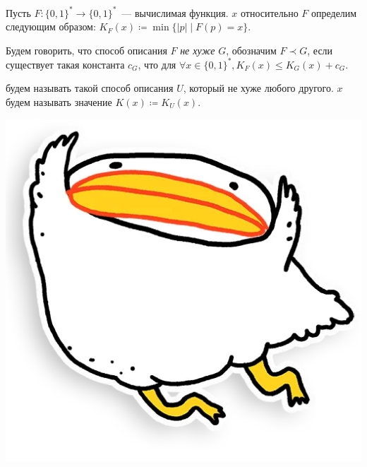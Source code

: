 








\begin{definition*}
    Пусть $F\colon \{0, 1\}^* \to \{0, 1\}^*$~--- вычислимая функция.  $x$
    относительно $F$ определим следующим образом: $K_F(x) \coloneqq \min\{|p| \mid F(p) = x\}$.

    Будем говорить, что способ описания $F$ \textit{не хуже} $G$, обозначим $F \prec G$, если существует
    такая константа $c_G$, что для $\forall x \in \{0, 1\}^*, K_F(x) \le K_G(x) +
    c_G$.

     будем называть такой способ описания $U$, который не хуже любого
    другого.  $x$ будем называть значение $K(x) \coloneqq K_U(x)$.
\end{definition*}






\vspace{0.2cm}
\begin{center}
    \includegraphics[scale = 0.2]{../pics/utia-fly.png}    
\end{center}





